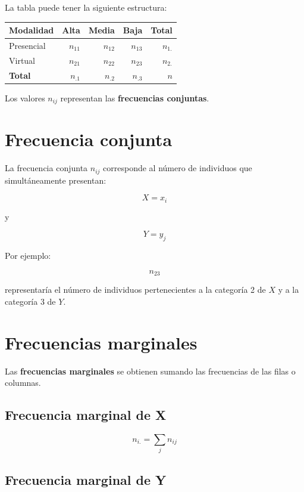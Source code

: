 \documentclass[
  spanish,
  14pt,
  letterpaper,
  DIV=11,
  numbers=noendperiod]{scrartcl}
\newcounter{none} %
\begin{document}
La tabla puede tener la siguiente estructura:

{\def\LTcaptype{none} %
\begin{longtable}[]{@{}lrrrr@{}}
\toprule\noalign{}
Modalidad & Alta & Media & Baja & Total \\
\midrule\noalign{}
\endhead
\bottomrule\noalign{}
\endlastfoot
Presencial & \(n_{11}\) & \(n_{12}\) & \(n_{13}\) & \(n_{1.}\) \\
Virtual & \(n_{21}\) & \(n_{22}\) & \(n_{23}\) & \(n_{2.}\) \\
\textbf{Total} & \(n_{.1}\) & \(n_{.2}\) & \(n_{.3}\) & \(n\) \\
\end{longtable}
}

Los valores \(n_{ij}\) representan las \textbf{frecuencias conjuntas}.

\section{Frecuencia conjunta}\label{frecuencia-conjunta}

La frecuencia conjunta \(n_{ij}\) corresponde al número de individuos
que simultáneamente presentan:

\[
X=x_i
\]

y

\[
Y=y_j
\]

Por ejemplo:

\[
n_{23}
\]

representaría el número de individuos pertenecientes a la categoría 2 de
\(X\) y a la categoría 3 de \(Y\).

\section{Frecuencias marginales}\label{frecuencias-marginales}

Las \textbf{frecuencias marginales} se obtienen sumando las frecuencias
de las filas o columnas.

\subsection{Frecuencia marginal de X}\label{frecuencia-marginal-de-x}

\[
n_{i.}=\sum_j n_{ij}
\]

\subsection{Frecuencia marginal de Y}\label{frecuencia-marginal-de-y}
\end{document}
